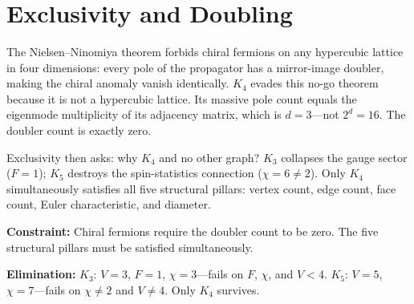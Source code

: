\documentclass[11pt,a4paper]{book}
\begin{document}
\begin{code}
\AgdaSymbol{=}\AgdaSpace{}%
\<%
\\
\>[0][@{}l@{\AgdaIndent{0}}]%
\>[2]\AgdaSymbol{\{}\AgdaSpace{}%
\AgdaSpace{}%
\AgdaSymbol{=}\AgdaSpace{}%
\<%
\\
%
\>[2]\AgdaSymbol{;}\AgdaSpace{}%
\AgdaSpace{}%
\AgdaSymbol{=}\AgdaSpace{}%
\<%
\\
%
\>[2]\AgdaSymbol{;}\AgdaSpace{}%
\AgdaSpace{}%
\AgdaSymbol{=}\AgdaSpace{}%
\<%
\\
%
\>[2]\AgdaSymbol{;}\AgdaSpace{}%
\AgdaSpace{}%
\AgdaSymbol{=}\AgdaSpace{}%
\<%
\\
%
\>[2]\AgdaSymbol{;}\AgdaSpace{}%
\AgdaSpace{}%
\AgdaSymbol{=}\AgdaSpace{}%
\AgdaSpace{}%
\AgdaSymbol{\}}\<%
\end{code}

\chapter{Exclusivity and Doubling}
\label{ch:exclusivity-doubling}

The Nielsen--Ninomiya theorem forbids chiral fermions on any hypercubic
lattice in four dimensions: every pole of the propagator has a mirror-image
doubler, making the chiral anomaly vanish identically.  $K_4$ evades this
no-go theorem because it is not a hypercubic lattice.  Its massive pole
count equals the eigenmode multiplicity of its adjacency matrix, which is
$d = 3$---not $2^d = 16$.  The doubler count is exactly zero.

Exclusivity then asks: why $K_4$ and no other graph?  $K_3$ collapses the
gauge sector ($F = 1$); $K_5$ destroys the spin-statistics connection
($\chi = 6 \neq 2$).  Only $K_4$ simultaneously satisfies all five
structural pillars: vertex count, edge count, face count, Euler characteristic,
and diameter.

\textbf{Constraint:}
Chiral fermions require the doubler count to be zero.  The five structural
pillars must be satisfied simultaneously.

\textbf{Elimination:}
$K_3$: $V{=}3$, $F{=}1$, $\chi{=}3$---fails on $F$, $\chi$, and $V < 4$.
$K_5$: $V{=}5$, $\chi{=}7$---fails on $\chi \neq 2$ and $V \neq 4$.
Only $K_4$ survives.
\end{document}
